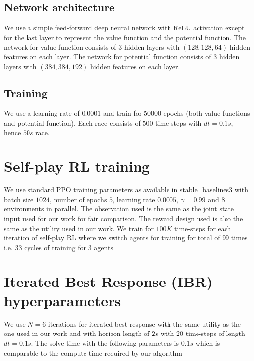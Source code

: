 \subsection{Network architecture}

We use a simple feed-forward deep neural network with ReLU activation except for the last layer to represent the value function and the potential function. The network for value function consists of $3$ hidden layers with $(128,128,64)$ hidden features on each layer. The network for potential function consists of $3$ hidden layers with $(384,384,192)$ hidden features on each layer. 

\subsection{Training}

We use a learning rate of $0.0001$ and train for $50000$ epochs (both value functions and potential function). Each race consists of $500$ time steps with $dt=0.1s$, hence $50s$ race.

\section{Self-play RL training}

We use standard PPO training parameters as available in stable\_baselines3 with batch size $1024$, number of epochs $5$, learning rate $0.0005$, $\gamma=0.99$ and $8$ environments in parallel. The observation used is the same as the joint state input used for our work for fair comparison. The reward design used is also the same as the utility used in our work. We train for $100K$ time-steps for each iteration of self-play RL where we switch agents for training for total of $99$ times i.e. $33$ cycles of training for $3$ agents

\section{Iterated Best Response (IBR) hyperparameters}

We use $N=6$ iterations for iterated best response with the same utility as the one used in our work and with horizon length of $2s$ with $20$ time-steps of length $dt=0.1s$. The solve time with the following parameters is $0.1s$ which is comparable to the compute time required by our algorithm
